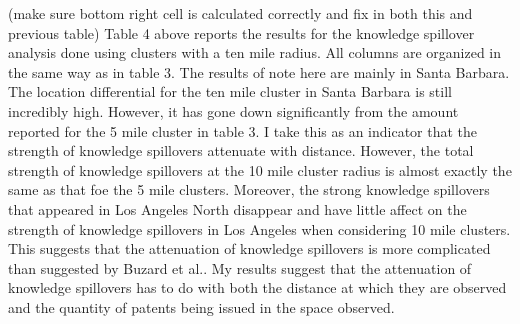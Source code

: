 \documentclass[12pt,letterpaper]{article}
\begin{document}
\begin{table}[H]
\centering
{}
\caption{}
\label{tab:4}
\end{table}
{\color{red}(make sure bottom right cell is calculated correctly and fix in both this and previous table)}
Table 4 above reports the results for the knowledge spillover analysis done using clusters with a ten mile radius. All columns are organized in the same way as in table 3. The results of note here are mainly in Santa Barbara. The location differential for the ten mile cluster in Santa Barbara is still incredibly high. However, it has gone down significantly from the amount reported for the 5 mile cluster in table 3. I take this as an indicator that the strength of knowledge spillovers attenuate with distance. However, the total strength of knowledge spillovers at the 10 mile cluster radius is almost exactly the same as that foe the 5 mile clusters. Moreover, the strong knowledge spillovers that appeared in Los Angeles North disappear and have little affect on the strength of knowledge spillovers in Los Angeles when considering 10 mile clusters. This suggests that the attenuation of knowledge spillovers is more complicated than suggested by Buzard et al.. My results suggest that the attenuation of knowledge spillovers has to do with both the distance at which they are observed and the quantity of patents being issued in the space observed. 
\end{document}
